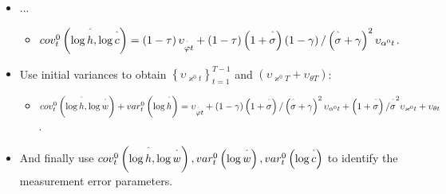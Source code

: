 \documentclass[notes=show]{beamer}
\begin{document}
\bigskip

\begin{frame}%


\begin{itemize}
\item ...

\begin{itemize}
\item $cov_{t}^{0}\left( \log \overset{\symbol{94}}{h},\log \overset{\symbol{%
94}}{c}\right) =\left( 1-\tau \right) \upsilon _{\overset{\symbol{94}}{%
\varphi }t}+\left( 1-\tau \right) \left( 1+\overset{\symbol{94}}{\sigma }%
\right) \left( 1-\gamma \right) /\left( \overset{\symbol{94}}{\sigma }%
+\gamma \right) ^{2}\upsilon _{\alpha ^{0}t}$.
\end{itemize}

\item Use initial variances to obtain $\left\{ \upsilon _{\varkappa
^{0}t}\right\} _{t=1}^{T-1}$ and $\left( \upsilon _{\varkappa
^{0}T}+\upsilon _{\theta T}\right) $:

\begin{itemize}
\item $cov_{t}^{0}\left( \log \overset{\symbol{94}}{h},\log \overset{\symbol{%
94}}{w}\right) +var_{t}^{0}\left( \log \overset{\symbol{94}}{h}\right)
=\upsilon _{\overset{\symbol{94}}{\varphi }t}+\left( 1-\gamma \right) \left(
1+\overset{\symbol{94}}{\sigma }\right) /\left( \overset{\symbol{94}}{\sigma 
}+\gamma \right) ^{2}\upsilon _{\alpha ^{0}t}+\left( 1+\overset{\symbol{94}}{%
\sigma }\right) /\overset{\symbol{94}}{\sigma }^{2}\upsilon _{\varkappa
^{0}t}+\upsilon _{\theta t}$.
\end{itemize}

\item And finally use $cov_{t}^{0}\left( \log \overset{\symbol{94}}{h},\log 
\overset{\symbol{94}}{w}\right) ,var_{t}^{0}\left( \log \overset{\symbol{94}}%
{w}\right) ,var_{t}^{0}\left( \log \overset{\symbol{94}}{c}\right) $ to
identify the measurement error parameters.
\end{itemize}

\transboxout%
\end{frame}%
\end{document}

